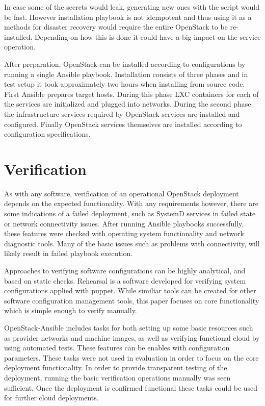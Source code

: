 \documentclass[officiallayout]{tktla}
\begin{document}
In case some of the secrets would leak, generating new ones with the script
would be fast. However installation playbook is not idempotent and thus using
it as a methods for disaster recovery would require the entire OpenStack to be
re-installed. Depending on how this is done it could have a big impact on the
service operation.

After preparation, OpenStack can be installed according to configurations by
running a single Ansible playbook. Installation consists of three phases and
in test setup it took approximately two hours when installing from source code.
First Ansible prepares target hosts. During this phase LXC containers for each
of the services are initialized and plugged into networks. During the second
phase the infrastructure services required by OpenStack services are installed
and configured. Finally OpenStack services themselves are installed according
to configuration specifications.

\section{Verification}

As with any software, verification of an operational OpenStack deployment
depends on the expected functionality. With any requirements however, there are
some indications of a failed deployment, such as SystemD services in failed
state or network connectivity issues. After running Ansible playbooks
successfully, these features were checked with operating system functionality
and network diagnostic tools. Many of the basic issues such as problems with
connectivity, will likely result in failed playbook execution.

Approaches to verifying software configurations can be highly analytical, and
based on static checks. Rehearsal \cite{rehearsal} is a software developed for
verifying system configurations applied with puppet. While similiar tools can
be created for other software configuration management tools, this paper
focuses on core functionality which is simple enough to verify manually.

OpenStack-Ansible includes tasks for both setting up some basic resources such
as provider networks and machine images, as well as verifying functional cloud
by using automated tests. These features can be enables with configuration
parameters. These tasks were not used in evaluation in order to focus on the
core deployment functionality. In order to provide transparent testing of the
deployment, running the basic verification operations manually was seen
sufficient. Once the deployment is confirmed functional these tasks could
be used for further cloud deployments.
\end{document}
